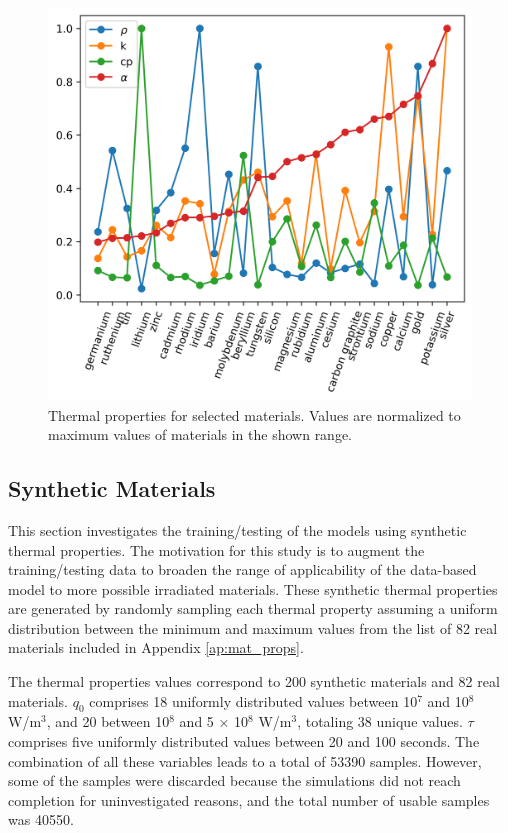 \begin{figure}[htbp!] %
    \centering
    \includegraphics[width=0.65\linewidth]{figures/alpha}
    \hfill
    \caption{Thermal properties for selected materials. Values are normalized to maximum values of materials in the shown range.}
    \label{fig:pre-cnfm-alpha-2}
\end{figure}


\subsection{Synthetic Materials}
\label{sec:syn-mat}

This section investigates the training/testing of the models using synthetic thermal properties.
The motivation for this study is to augment the training/testing data to broaden the range of applicability of the data-based model to more possible irradiated materials.
These synthetic thermal properties are generated by randomly sampling each thermal property assuming a uniform distribution between the minimum and maximum values from the list of 82 real materials included in Appendix \ref{ap:mat_props}.

The thermal properties values correspond to 200 synthetic materials and 82 real materials.
$q_0$ comprises 18 uniformly distributed values between 10$^7$ and 10$^8$ W/m$^3$, and 20 between 10$^8$ and 5 $\times$ 10$^8$ W/m$^3$, totaling 38 unique values.
$\tau$ comprises five uniformly distributed values between 20 and 100 seconds.
The combination of all these variables leads to a total of 53390 samples.
However, some of the samples were discarded because the simulations did not reach completion for uninvestigated reasons, and the total number of usable samples was 40550.

